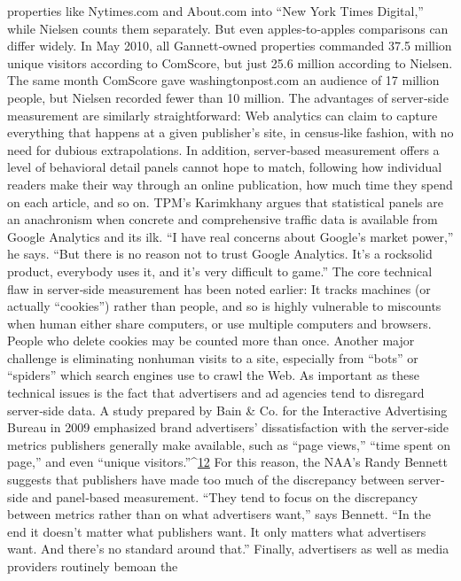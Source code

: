properties like Nytimes.com and About.com into ``New York Times
Digital,'' while Nielsen counts them separately. But even apples‐to‐apples
comparisons can differ widely. In May 2010, all Gannett‐owned properties
commanded 37.5 million unique visitors according to ComScore, but just
25.6 million according to Nielsen. The same month ComScore gave
washingtonpost.com an audience of 17 million people, but Nielsen
recorded fewer than 10 million.
The advantages of server‐side measurement are similarly straightforward:
Web analytics can claim to capture everything that happens at a given
publisher’s site, in census‐like fashion, with no need for dubious
extrapolations. In addition, server‐based measurement offers a level of
behavioral detail panels cannot hope to match, following how individual
readers make their way through an online publication, how much time
they spend on each article, and so on.
TPM’s Karimkhany argues that statistical panels are an anachronism
when concrete and comprehensive traffic data is available from Google
Analytics and its ilk. ``I have real concerns about Google’s market power,''
he says. ``But there is no reason not to trust Google Analytics. It’s a rocksolid
product, everybody uses it, and it’s very difficult to game.''
The core technical flaw in server‐side measurement has been noted earlier:
It tracks machines (or actually ``cookies'') rather than people, and so is
highly vulnerable to miscounts when human either share computers, or
use multiple computers and browsers. People who delete cookies may be
counted more than once. Another major challenge is eliminating nonhuman
visits to a site, especially from ``bots'' or ``spiders'' which search
engines use to crawl the Web.
As important as these technical issues is the fact that advertisers and ad
agencies tend to disregard server‐side data. A study prepared by Bain &
Co. for the Interactive Advertising Bureau in 2009 emphasized brand
advertisers’ dissatisfaction with the server‐side metrics publishers
generally make available, such as ``page views,'' ``time spent on page,''
and even ``unique visitors.''^{\href{#endnotes}{12}}
For this reason, the NAA’s Randy Bennett suggests that publishers have
made too much of the discrepancy between server‐side and panel‐based
measurement. ``They tend to focus on the discrepancy between metrics
rather than on what advertisers want,'' says Bennett. ``In the end it doesn’t
matter what publishers want. It only matters what advertisers want. And
there’s no standard around that.''
Finally, advertisers as well as media providers routinely bemoan the
